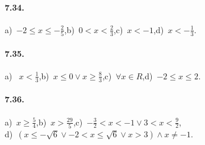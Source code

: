 \paragraph{7.34.} a)~$-2\le x\le -\frac 2 5$,\quad b)~$0<x<\frac 2 3$,\quad c)~$x<-1$,\quad d)~$x<-\frac 1 3$.

\paragraph{7.35.} a)~ $x<\frac 1 3$,\quad b)~$x\le 0\vee x\ge \frac 8 3$,\quad c)~$\forall x\in R$,\quad d)~$-2\le x\le 2$.

\paragraph{7.36.} a)~$x\ge \frac 5 4$,\quad b)~$x>\frac{29} 5$,\quad c)~$-\frac 3 2<x<-1\vee 3<x<\frac 9 2$,\protect\\
\quad d)~$(x\le -\sqrt 6\vee -2<x\le \sqrt 6\vee x>3)\wedge x\neq -1$.
